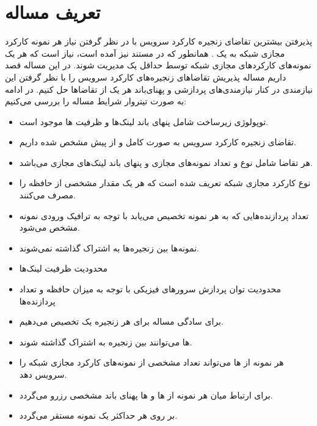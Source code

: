 \chapter{تعریف مساله}
پذیرفتن بیشترین تقاضای زنجیره‌ کارکرد سرویس با در نظر گرفتن نیاز هر نمونه کارکرد مجازی شبکه به یک .
همانطور که در مستند \cite{} نیز آمده است، نیاز است که هر یک نمونه‌های کارکردهای مجازی شبکه
توسط حداقل یک  مدیریت شوند.
در این مساله قصد داریم مساله پذیریش تقاضاهای زنجیره‌های کارکرد سرویس را با نظر گرفتن این نیازمندی در کنار
نیازمندی‌های پردازشی و پهنای‌باند هر یک از تقاضاها حل کنیم.
در ادامه به صورت تیتروار شرایط مساله را بررسی می‌کنیم:

\begin{itemize}
	\item توپولوژی زیرساخت شامل پنهای باند لینک‌ها و ظرفیت ها موجود است.
	\item {} تقاضای زنجیره‌ کارکرد سرویس به صورت کامل و از پیش مشخص شده داریم.
	\item هر تقاضا شامل نوع و تعداد نمونه‌های مجازی و پنهای باند لینک‌های مجازی می‌باشد.
	\item {} نوع کارکرد مجازی شبکه تعریف شده است که هر یک مقدار مشخصی از حافظه را مصرف می‌کنند.
	\item تعداد پردازنده‌هایی که به هر نمونه تخصیص می‌یابد با توجه به ترافیک ورودی نمونه مشخص می‌شود.
	\item نمونه‌ها بین زنجیره‌ها به اشتراک گذاشته نمی‌شوند.
	\item محدودیت ظرفیت لینک‌ها
	\item محدودیت توان پردازش سرورهای فیزیکی با توجه به میزان حافظه و تعداد پردازنده‌ها
	\item برای سادگی مساله برای هر زنجیره یک  تخصیص می‌دهیم.
	\item {}ها می‌توانند بین زنجیره به اشتراک گذاشته شوند.
	\item هر نمونه از ها می‌تواند تعداد مشخصی از نمونه‌های کارکرد مجازی شبکه را سرویس دهد. 
	\item برای ارتباط میان هر نمونه از ها و ها پهنای باند مشخصی رزرو می‌گردد.
	\item بر روی هر  حداکثر یک نمونه  مستقر می‌گردد.
\end{itemize}